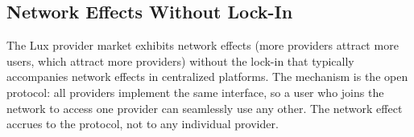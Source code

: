\subsection{Network Effects Without Lock-In}

The Lux provider market exhibits network effects (more providers attract
more users, which attract more providers) without the lock-in that
typically accompanies network effects in centralized platforms. The
mechanism is the open protocol: all providers implement the same
interface, so a user who joins the network to access one provider
can seamlessly use any other. The network effect accrues to the
protocol, not to any individual provider.

